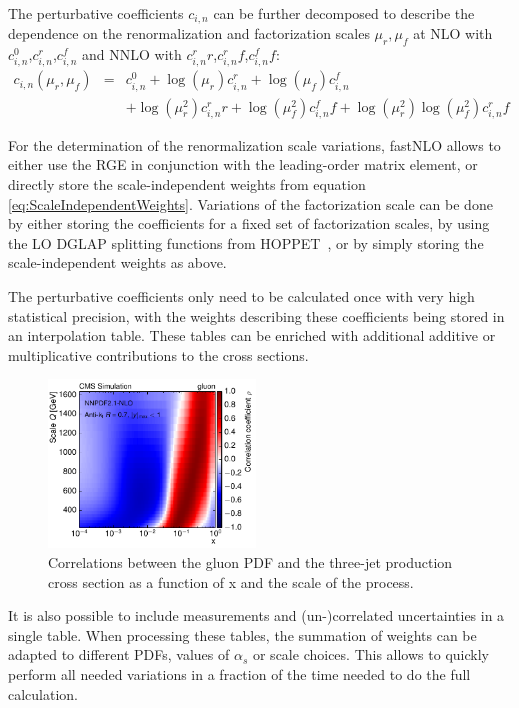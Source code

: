 \documentclass{PoS}
\begin{document}
The perturbative coefficients $c_{i,n}$ can be further decomposed to describe
the dependence on the renormalization and factorization scales $\mu_r, \mu_f$
at NLO with $c_{i,n}^0$,$c_{i,n}^r$,$c_{i,n}^f$ and NNLO with
$c_{i,n}^rr$,$c_{i,n}^rf$,$c_{i,n}^ff$:
\begin{eqnarray}\label{eq:ScaleIndependentWeights}
  c_{i,n}(\mu_r,\mu_f) &=& c_{i,n}^0 + \log(\mu_r)c_{i,n}^r +  \log(\mu_f) c_{i,n}^f \nonumber \\
     &&+ \log(\mu_r^2)c_{i,n}^rr + \log(\mu_f^2) c_{i,n}^ff + \log(\mu_r^2)\log(\mu_f^2) c_{i,n}^rf
\end{eqnarray}

For the determination of the renormalization scale variations, fastNLO allows
to either use the RGE in conjunction with the leading-order matrix element,
or directly store the scale-independent weights from equation \ref{eq:ScaleIndependentWeights}.
Variations of the factorization scale can be done by either storing the
coefficients for a fixed set of factorization scales, by using the LO DGLAP
splitting functions from HOPPET~\cite{Salam:2008qg}, or by simply storing
the scale-independent weights as above.

The perturbative coefficients only need to be calculated once with
very high statistical precision, with the weights describing these
coefficients being stored in an interpolation table.
These tables can be enriched with additional additive or multiplicative
contributions to the cross sections.

\begin{figure}
 \centering
  \includegraphics[width=0.49\textwidth]{05_correlation_g_0_1}
  \caption{Correlations between the gluon PDF and the three-jet production cross section
  as a function of x and the scale of the process\cite{CMS:2014mna}.}
  \label{Fig:correlations}
\end{figure}

It is also possible to include measurements and (un-)correlated uncertainties in a single table.
When processing these tables, the summation of weights can be adapted
to different PDFs, values of $\alpha_s$ or scale choices. This allows to quickly perform
all needed variations in a fraction of the time needed to do the full
calculation.
\end{document}
